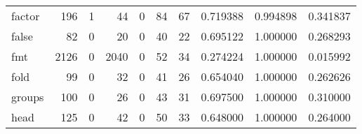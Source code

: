 \begin{tabular}{lrrrrrrrrr}
factor    &                                                196 &                                                  1 &                                                 44 &                                                  0 &                                                 84 &                                                 67 &                                           0.719388 &                               0.994898 &                             0.341837 \\
false     &                                                 82 &                                                  0 &                                                 20 &                                                  0 &                                                 40 &                                                 22 &                                           0.695122 &                               1.000000 &                             0.268293 \\
fmt       &                                               2126 &                                                  0 &                                               2040 &                                                  0 &                                                 52 &                                                 34 &                                           0.274224 &                               1.000000 &                             0.015992 \\
fold      &                                                 99 &                                                  0 &                                                 32 &                                                  0 &                                                 41 &                                                 26 &                                           0.654040 &                               1.000000 &                             0.262626 \\
groups    &                                                100 &                                                  0 &                                                 26 &                                                  0 &                                                 43 &                                                 31 &                                           0.697500 &                               1.000000 &                             0.310000 \\
head      &                                                125 &                                                  0 &                                                 42 &                                                  0 &                                                 50 &                                                 33 &                                           0.648000 &                               1.000000 &                             0.264000 \\

\end{tabular}
